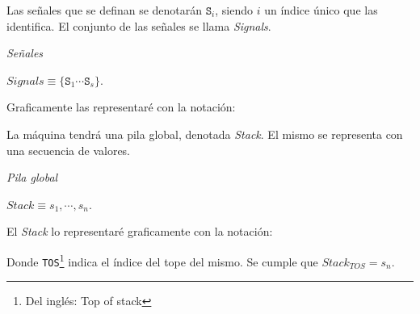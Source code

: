  

  Las señales que se definan se denotarán $\texttt{S}_i$, siendo $i$ un
  índice único que las identifica. El conjunto de las señales se llama
  \textit{Signals}.

\begin{definicion}
  \textit{Señales}
  \begin{center}
    $\textit{Signals} \equiv \{\texttt{S}_1 \dotsb \texttt{S}_s\}$.
  \end{center}
\end{definicion}

  Graficamente las representaré con la notación:

  

  La máquina tendrá una pila global, denotada \textit{Stack}. El mismo
  se representa con una secuencia de valores.

\begin{definicion}
  \textit{Pila global}
  \begin{center}
    $\textit{Stack} \equiv s_1, \dotsb, s_n$.
  \end{center}
\end{definicion}

  El \textit{Stack} lo representaré graficamente con la notación:

  

  Donde \texttt{TOS}\footnote{Del inglés: Top
  of stack} indica el índice del tope del mismo.
  Se cumple que $\textit{Stack}_{TOS} = s_n$.
